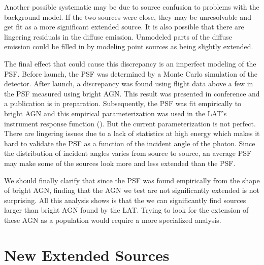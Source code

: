 \documentclass[12pt,preprint]{aastex}
\newcommand{\gev}{\text{GeV}\xspace}
\begin{document}
Another possible systematic may be due to source confusion to problems
with the background model. If the two sources were close, they may
be unresolvable and get fit as a more significant extended source.
It is also possible that there are lingering residuals in the diffuse
emission. Unmodeled parts of the diffuse emission could be filled in by
modeling point sources as being slightly extended.

The final effect that could cause this discrepancy is an imperfect
modeling of the PSF.  Before launch, the PSF
was determined by a Monte Carlo simulation of the detector.
After launch, a discrepancy was found using flight data above a
few \gev in the PSF measured using bright AGN.  This result
was presented in conference and a publication is in preparation.
Subsequently, the PSF was fit empirically to bright AGN and this
empirical parameterization was used in the LAT's instrument
response function (\cite{lat_on_orbit_psf}).
But the current parameterization is not perfect. There are lingering
issues due to a lack of statistics at high energy which makes it hard to
validate the PSF as a function of the incident angle of the photon. Since
the distribution of incident angles varies from source to source, an
average PSF may make some of the sources look more and less extended
than the PSF.

We should finally clarify that since the PSF was found empirically
from the shape of bright AGN, finding that the AGN we test are not
significantly extended is not surprising.  All this analysis shows
is that the we can significantly find sources larger than bright AGN
found by the LAT.  Trying to look for the extension of these AGN as a
population would require a more specialized analysis.

\section{New Extended Sources}
\label{new_ext_srcs_section}


\end{document}
